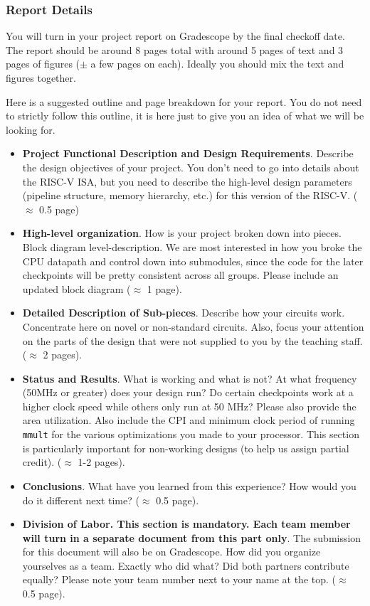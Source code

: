 \documentclass[11pt]{article}
\begin{document}
\subsubsection{Report Details}
You will turn in your project report on Gradescope by the final checkoff date.
The report should be around 8 pages total with around 5 pages of text and 3 pages of figures ($\pm$ a few pages on each).
Ideally you should mix the text and figures together.

Here is a suggested outline and page breakdown for your report.
You do not need to strictly follow this outline, it is here just to give you an idea of what we will be looking for.

\begin{itemize}
  \item \textbf{Project Functional Description and Design Requirements}. Describe the design objectives of your project.  You don't need to go into details about the RISC-V ISA, but you need to describe the high-level design parameters (pipeline structure, memory hierarchy, etc.) for this version of the RISC-V. ($\approx$ 0.5 page)
  \item \textbf{High-level organization}. How is your project broken down into pieces. Block diagram level-description. We are most interested in how you broke the CPU datapath and control
  down into submodules, since the code for the later checkpoints will be pretty consistent across all groups. Please include an updated block diagram ($\approx$ 1 page).
  \item \textbf{Detailed Description of Sub-pieces}. Describe how your circuits work. Concentrate here on novel or non-standard circuits. Also, focus your attention on the parts of the design that were not supplied to you by the teaching staff. ($\approx$ 2 pages).
  \item \textbf{Status and Results}. What is working and what is not? At what frequency (50MHz or greater) does your design run? Do certain checkpoints work at a higher clock speed while others only run at 50 MHz? Please also provide the area utilization. Also include the CPI and minimum clock period of running \verb|mmult| for the various optimizations you made to your processor. This section is particularly important for non-working designs (to help us assign partial credit). ($\approx$ 1-2 pages).
  \item \textbf{Conclusions}. What have you learned from this experience? How would you do it different next time? ($\approx$ 0.5 page).
  \item \textbf{Division of Labor. This section is mandatory. Each team member will turn in a separate document from this part only}. The submission for this document will also be on Gradescope. How did you organize yourselves as a team. Exactly who did what? Did both partners contribute equally? Please note your team number next to your name at the top. ($\approx$ 0.5 page).
\end{itemize}
\end{document}
